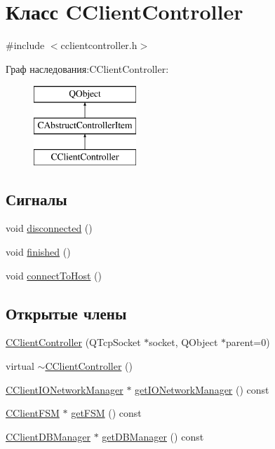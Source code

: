 \hypertarget{class_c_client_controller}{}\section{Класс C\+Client\+Controller}
\label{class_c_client_controller}


{\ttfamily \#include $<$cclientcontroller.\+h$>$}

Граф наследования\+:C\+Client\+Controller\+:\begin{figure}[H]
\begin{center}
\leavevmode
\includegraphics[height=3.000000cm]{class_c_client_controller}
\end{center}
\end{figure}
\subsection*{Сигналы}
\begin{DoxyCompactItemize}
\item 
void \hyperlink{class_c_client_controller_a171db18126ffb9541f47aec5cc0eda79}{disconnected} ()
\item 
void \hyperlink{class_c_client_controller_a04a024fdb1135b1b5dec86b006511672}{finished} ()
\item 
void \hyperlink{class_c_client_controller_a358ef743560d560acef69e90dfaca11e}{connect\+To\+Host} ()
\end{DoxyCompactItemize}
\subsection*{Открытые члены}
\begin{DoxyCompactItemize}
\item 
\hyperlink{class_c_client_controller_a95dd0dfe547a620dee2ae10790dee6be}{C\+Client\+Controller} (Q\+Tcp\+Socket $\ast$socket, Q\+Object $\ast$parent=0)
\item 
virtual \hyperlink{class_c_client_controller_adfd7338529c1b00e8ea52fa973141e70}{$\sim$\+C\+Client\+Controller} ()
\item 
\hyperlink{class_c_client_i_o_network_manager}{C\+Client\+I\+O\+Network\+Manager} $\ast$ \hyperlink{class_c_client_controller_ab39fa71b009189acc06aa759d636de4d}{get\+I\+O\+Network\+Manager} () const
\item 
\hyperlink{class_c_client_f_s_m}{C\+Client\+F\+SM} $\ast$ \hyperlink{class_c_client_controller_a07441870867b13d7c867e57244101f92}{get\+F\+SM} () const
\item 
\hyperlink{class_c_client_d_b_manager}{C\+Client\+D\+B\+Manager} $\ast$ \hyperlink{class_c_client_controller_a456359547ec2e4225d54daeb6463008b}{get\+D\+B\+Manager} () const
\end{DoxyCompactItemize}
